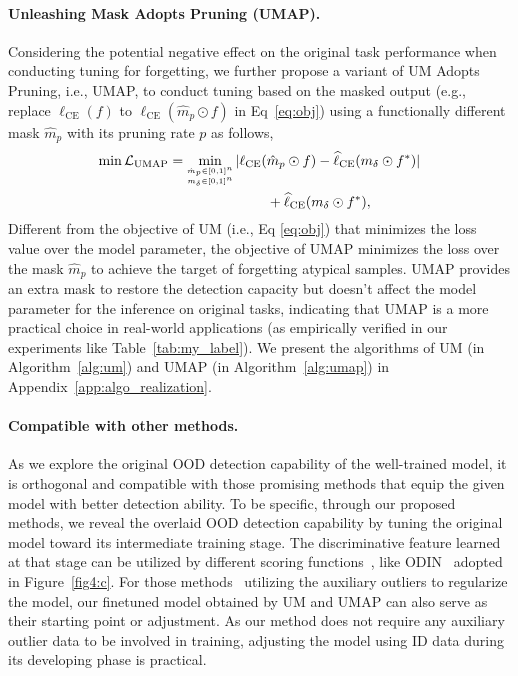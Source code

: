 \documentclass{article}
\theoremstyle{plain}
\theoremstyle{definition}
\theoremstyle{remark}
\begin{document}
\paragraph{Unleashing Mask Adopts Pruning (UMAP).}  Considering the potential negative effect on the original task performance when conducting tuning for forgetting, we further propose a variant of UM Adopts Pruning, i.e., UMAP, to conduct tuning based on the masked output (e.g., replace $\ell_\text{CE}(f)$ to $\ell_\text{CE}(\hat{m}_p \odot f)$ in Eq~\ref{eq:obj}) using a functionally different mask $\hat{m}_p$ with its pruning rate $p$ as follows,
\begin{equation}
\begin{split}
\scriptsize
\vspace{-4mm}
\min \mathcal{L}_{\text{UMAP}} 
=  \min_{\substack{\hat{m}_p\in[0,1]^n\\ m_\delta\in[0,1]^n}} |\ell_\text{CE}(&\hat{m}_p\odot f) - \widehat{\ell}_\text{CE}(m_\delta\odot f^*)|\\
&+\widehat{\ell}_\text{CE}(m_\delta\odot f^*),
\vspace{-4mm}
\end{split}
\end{equation}\label{eq:obj_umap}
Different from the objective of UM (i.e., Eq \ref{eq:obj}) that minimizes the loss value over the model parameter, the objective of UMAP minimizes the loss over the mask $\hat{m}_p$ to achieve the target of forgetting atypical samples. UMAP provides an extra mask to restore the detection capacity but doesn't affect the model parameter for the inference on original tasks, indicating that UMAP is a more practical choice in real-world applications (as empirically verified in our experiments like Table~\ref{tab:my_label}). We present the algorithms of UM (in Algorithm~\ref{alg:um}) and UMAP (in Algorithm~\ref{alg:umap}) in Appendix~\ref{app:algo_realization}.

\paragraph{Compatible with other methods.} As we explore the original OOD detection capability of the well-trained model, it is orthogonal and compatible with those promising methods that equip the given model with better detection ability. To be specific, through our proposed methods, we reveal the overlaid OOD detection capability by tuning the original model toward its intermediate training stage. 
The discriminative feature learned at that stage can be utilized by different scoring functions~\citep{huang2021importance,liu2020energy,sun2022dice}, like ODIN~\citep{LiangLS18} adopted in Figure~\ref{fig4:c}. For those methods~\citep{hendrycks2019using,liu2020energy, ming2022poem} utilizing the auxiliary outliers to regularize the model, our finetuned model obtained by UM and UMAP can also serve as their starting point or adjustment. As our method does not require any auxiliary outlier data to be involved in training, adjusting the model using ID data during its developing phase is practical.
\end{document}

